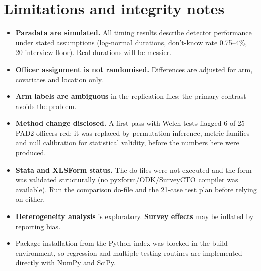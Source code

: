 \documentclass[11pt,a4paper]{article}
\begin{document}
\section{Limitations and integrity notes}\label{sec:limits}
\begin{itemize}
\item \textbf{Paradata are simulated.} All timing results describe detector performance under stated assumptions (log-normal durations, don't-know rate 0.75--4\%, 20-interview floor). Real durations will be messier.
\item \textbf{Officer assignment is not randomised.} Differences are adjusted for arm, covariates and location only.
\item \textbf{Arm labels are ambiguous} in the replication files; the primary contrast avoids the problem.
\item \textbf{Method change disclosed.} A first pass with Welch tests flagged 6 of 25 PAD2 officers red; it was replaced by permutation inference, metric families and null calibration for statistical validity, before the numbers here were produced.
\item \textbf{Stata and XLSForm status.} The do-files were not executed and the form was validated structurally (no pyxform/ODK/SurveyCTO compiler was available). Run the comparison do-file and the 21-case test plan before relying on either.
\item \textbf{Heterogeneity analysis} is exploratory. \textbf{Survey effects} may be inflated by reporting bias.
\item Package installation from the Python index was blocked in the build environment, so regression and multiple-testing routines are implemented directly with NumPy and SciPy.
\end{itemize}

\appendix
\end{document}

